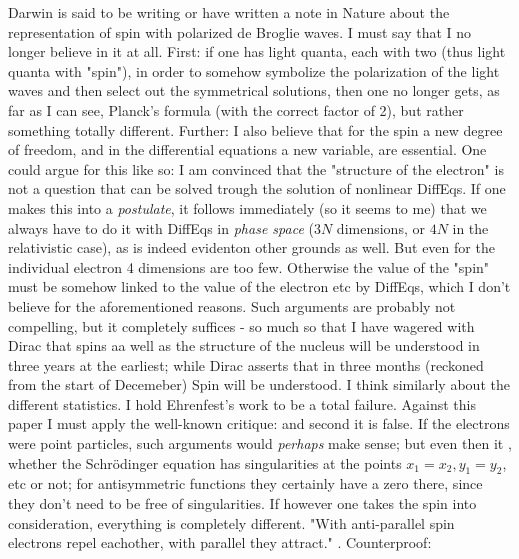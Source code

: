 \documentclass{article}
\begin{document}
{Darwin is said to be writing or have written a note in Nature about the representation of spin with polarized de Broglie waves. I must say that I no longer believe in it at all. First: if one has light quanta, each with two  (thus light quanta with "spin"), in order to somehow symbolize the polarization of the light waves and then select out the symmetrical solutions, then one no longer gets, as far as I can see, Planck's formula (with the correct factor of 2), but rather something totally different. Further: I also believe that for the spin a new degree of freedom, and in the differential equations a new variable, are essential. One could argue for this like so: I am convinced that the "structure of the electron" is not a question that can be solved trough the solution of nonlinear DiffEqs. If one makes this into a \textit{postulate}, it follows immediately (so it seems to me) that we always have to do it with DiffEqs in \textit{phase space} ($3N$ dimensions, or $4N$ in the relativistic case), as is indeed evidenton other grounds as well. But even for the individual electron 4 dimensions are too few. Otherwise the value of the "spin" must be somehow linked to the value of the electron etc by DiffEqs, which I don't believe for the aforementioned reasons. Such arguments are probably not compelling, but  it completely suffices - so much so that I have wagered with Dirac that spins aa well as the structure of the nucleus will be understood in three years at the earliest; while Dirac asserts that in three months (reckoned from the start of Decemeber) Spin will be understood. I think similarly about the different statistics. I hold Ehrenfest's work to be a total failure. Against this paper I must apply the well-known critique:  and second it is false. If the electrons were point particles, such arguments would \textit{perhaps} make sense; but even then it , whether the Schr\"odinger equation has singularities at the points $x_1=x_2,y_1=y_2$, etc or not; for antisymmetric functions they certainly have a zero there, since they don't need to be free of singularities. If however one takes the spin into consideration, everything is completely different. "With anti-parallel spin electrons repel eachother, with parallel they attract." . Counterproof:

}
\end{document}
